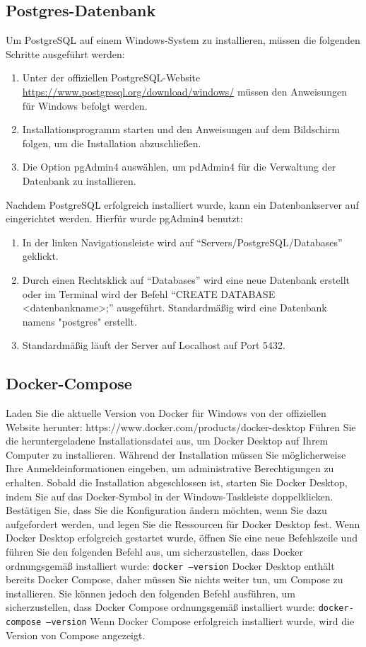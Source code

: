 \documentclass[a4paper,12pt,titlepage]{article}
\begin{document}
\subsection{Postgres-Datenbank}
Um PostgreSQL auf einem Windows-System zu installieren, müssen die folgenden Schritte ausgeführt werden:

\begin{enumerate}
\item Unter der offiziellen PostgreSQL-Website \url{https://www.postgresql.org/download/windows/} müssen den Anweisungen für Windows befolgt werden.
\item Installationsprogramm starten und den Anweisungen auf dem Bildschirm folgen, um die Installation abzuschließen.
\item Die Option pgAdmin4 auswählen, um pdAdmin4 für die Verwaltung der Datenbank zu installieren.
\end{enumerate}

Nachdem PostgreSQL erfolgreich installiert wurde, kann ein Datenbankserver auf eingerichtet werden. Hierfür wurde pgAdmin4 benutzt:

\begin{enumerate}
\item In der linken Navigationsleiste wird auf \enquote{Servers/PostgreSQL/Databases} geklickt.
\item Durch einen Rechtsklick auf \enquote{Databases} wird eine neue Datenbank erstellt oder im Terminal wird der Befehl \enquote{CREATE DATABASE <datenbankname>;} ausgeführt. Standardmäßig wird eine Datenbank namens "postgres" erstellt.
\item Standardmäßig läuft der Server auf Localhost auf Port 5432.
\end{enumerate}

\subsection{Docker-Compose}
Laden Sie die aktuelle Version von Docker für Windows von der offiziellen Website herunter: https://www.docker.com/products/docker-desktop
Führen Sie die heruntergeladene Installationsdatei aus, um Docker Desktop auf Ihrem Computer zu installieren. Während der Installation müssen Sie möglicherweise Ihre Anmeldeinformationen eingeben, um administrative Berechtigungen zu erhalten.
Sobald die Installation abgeschlossen ist, starten Sie Docker Desktop, indem Sie auf das Docker-Symbol in der Windows-Taskleiste doppelklicken.
Bestätigen Sie, dass Sie die Konfiguration ändern möchten, wenn Sie dazu aufgefordert werden, und legen Sie die Ressourcen für Docker Desktop fest.
Wenn Docker Desktop erfolgreich gestartet wurde, öffnen Sie eine neue Befehlszeile und führen Sie den folgenden Befehl aus, um sicherzustellen, dass Docker ordnungsgemäß installiert wurde:
\texttt{docker --version}
Docker Desktop enthält bereits Docker Compose, daher müssen Sie nichts weiter tun, um Compose zu installieren. Sie können jedoch den folgenden Befehl ausführen, um sicherzustellen, dass Docker Compose ordnungsgemäß installiert wurde:
\texttt{docker-compose --version}
Wenn Docker Compose erfolgreich installiert wurde, wird die Version von Compose angezeigt.
\end{document}
